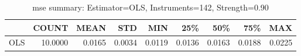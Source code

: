 \begin{table}[ht]
\centering
\caption{mse summary: Estimator=OLS, Instruments=142, Strength=0.90}
\begin{tabular}{lrrrrrrrr}
\toprule
 & COUNT & MEAN & STD & MIN & 25\% & 50\% & 75\% & MAX \\
\midrule
OLS & 10.0000 & 0.0165 & 0.0034 & 0.0119 & 0.0136 & 0.0163 & 0.0188 & 0.0225 \\
\bottomrule
\end{tabular}
\end{table}
